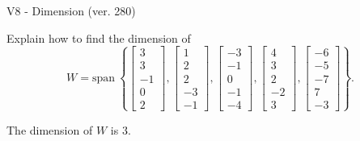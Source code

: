 \begin{exercise}
  \begin{exerciseTitle}V8 - Dimension (ver. 280)\end{exerciseTitle}
  \begin{exerciseStatement}
    Explain how to find the dimension of 
\[W=\mathrm{span}\ \left\{\left[\begin{array}{r}
3 \\
3 \\
-1 \\
0 \\
2
\end{array}\right] , \left[\begin{array}{r}
1 \\
2 \\
2 \\
-3 \\
-1
\end{array}\right] , \left[\begin{array}{r}
-3 \\
-1 \\
0 \\
-1 \\
-4
\end{array}\right] , \left[\begin{array}{r}
4 \\
3 \\
2 \\
-2 \\
3
\end{array}\right] , \left[\begin{array}{r}
-6 \\
-5 \\
-7 \\
7 \\
-3
\end{array}\right]\right\}.\]



  \end{exerciseStatement}
  \begin{exerciseAnswer}
   The dimension of \(W\) is  \(3\).
  


  \end{exerciseAnswer}
\end{exercise}